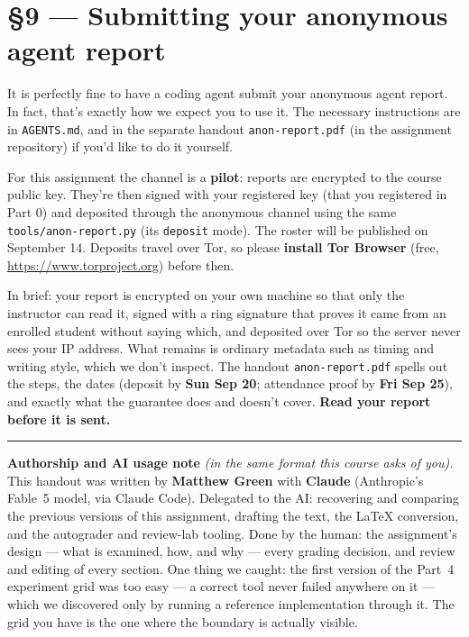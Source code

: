 \documentclass[11pt]{article}
\newcommand{\code}[1]{\texttt{#1}}
\newcommand{\file}[1]{\texttt{#1}}
\begin{document}
\section*{\S9 --- Submitting your anonymous agent report}

It is perfectly fine to have a coding agent submit your anonymous agent report. In fact, that's exactly how we expect you to use it. The necessary instructions are in {\tt AGENTS.md}, and in the separate handout \file{anon-report.pdf} (in the assignment repository) if you'd like to do it yourself.

For this assignment the channel is a \textbf{pilot}: reports are encrypted to the course public key. They're then signed with your registered key (that you registered in Part 0) and deposited through the anonymous channel using the same \file{tools/anon-report.py} (its \code{deposit} mode). The roster will be published on September 14. Deposits travel over Tor, so please \textbf{install Tor Browser} (free, \url{https://www.torproject.org}) before then.

\medskip\noindent In brief: your report is encrypted on your own machine so that only the instructor can read it, signed with a ring signature that proves it came from an enrolled student without saying which, and deposited over Tor so the server never sees your IP address. What remains is ordinary metadata such as timing and writing style, which we don't inspect. The handout \file{anon-report.pdf} spells out the steps, the dates (deposit by \textbf{Sun Sep 20}; attendance proof by \textbf{Fri Sep 25}), and exactly what the guarantee does and doesn't cover. \textbf{Read your report before it is sent.}


\bigskip
\noindent\rule{\textwidth}{0.4pt}

\medskip\noindent\textbf{Authorship and AI usage note} \emph{(in the same format this course asks of you).} This handout was written by \textbf{Matthew Green} with \textbf{Claude} (Anthropic's Fable~5 model, via Claude Code). Delegated to the AI: recovering and comparing the previous versions of this assignment, drafting the text, the \LaTeX{} conversion, and the autograder and review-lab tooling. Done by the human: the assignment's design --- what is examined, how, and why --- every grading decision, and review and editing of every section. One thing we caught: the first version of the Part~4 experiment grid was too easy --- a correct tool never failed anywhere on it --- which we discovered only by running a reference implementation through it. The grid you have is the one where the boundary is actually visible.
\end{document}
